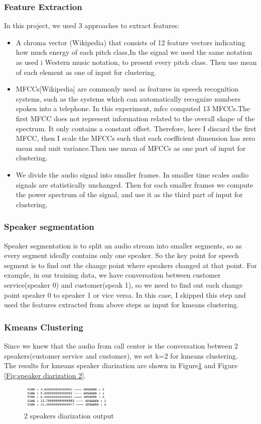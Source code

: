 \documentclass[journal, a4paper]{IEEEtran}
\begin{document}
\subsubsection{Feature Extraction}
In this project, we used 3 approaches to extract features:
\begin{itemize}
    \item A chroma vector (Wikipedia) that consists of 12 feature vectors indicating how much energy of each pitch class,In the signal we used the same notation as used i Western music notation, to present every pitch class. Then use mean of each element as one of input for clustering.
    \item MFCCs[Wikipedia] are commonly used as features in speech recognition systems, such as the systems which can automatically recognize numbers spoken into a telephone. In this experiment, mfcc computed 13 MFCCs.The first MFCC does not represent information related to the overall shape of the spectrum. It only contains a constant offset. Therefore, here I discard the first MFCC, then I scale the MFCCs such that each coefficient dimension has zero mean and unit variance.Then use mean of MFCCs as one part of input for clustering.
    \item We divide the audio signal into smaller frames. In smaller time scales audio signals are statistically unchanged. Then for each smaller frames we compute the power spectrum of the signal, and use it as the third part of input for clustering.
\end{itemize}
\subsubsection{Speaker segmentation}\cite{Segmentation} Speaker segmentation is to split an audio stream into smaller segments, so as every segment ideally contains only one speaker. So the key point for speech segment is to find out the change point where speakers changed at that point. For example, in our training data, we have conversation between customer service(speaker 0) and customer(speak 1), so we need to find out each change point speaker 0 to speaker 1 or vice versa. In this case, I skipped this step and used the features extracted from above steps as input for kmeans clustering.
\subsubsection{Kmeans Clustering}
Since we knew that the audio from call center is the conversation between 2 speakers(customer service and customer), we set k=2 for kmeans clustering.\\
The results for kmeans speaker diarization are shown in Figure\ref{Fig:speaker diarization 1} and Figure \ref{Fig:speaker diarization 2}.
\begin{figure}[h!]
    \centering  
     \caption{\label{Fig:speaker diarization 1}2 speakers diarization output}  
    \includegraphics[width=0.4\textwidth]{kmeans01.png} 
\end{figure}
\end{document}
